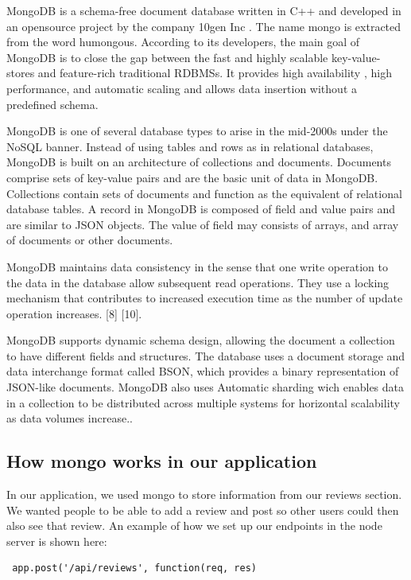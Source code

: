 MongoDB is a schema-free document database written in C++ and developed in an opensource project by the company 10gen Inc \cite{mongoname}. The name mongo is extracted from the word humongous. According to its developers, the main
goal of MongoDB is to close the gap between the fast and highly scalable key-value-stores and feature-rich traditional RDBMSs.
It provides high availability , high performance, and automatic scaling
and allows data insertion without a predefined schema. 

MongoDB is one of several database types to arise in the mid-2000s under the NoSQL banner. Instead of using tables and rows as in relational databases, MongoDB is built on an architecture of collections and documents. Documents comprise sets of key-value pairs and are the basic unit of data in MongoDB. Collections contain sets of documents and function as the equivalent of relational database tables. 
A record in MongoDB is composed of field and value pairs and are similar to
JSON objects. The value of field may consists of arrays, and array of documents
or other documents.

MongoDB maintains data consistency in the
sense that one write operation to the data in the database allow subsequent
read operations. They use a locking mechanism that contributes to increased
execution time as the number of update operation increases. [8] [10].

MongoDB supports dynamic schema design, allowing the document a collection to have different fields and structures. The database uses a document storage and data interchange format called BSON, which provides a binary representation of JSON-like documents. MongoDB also uses Automatic sharding wich enables data in a collection to be distributed across multiple systems for horizontal scalability as data volumes increase.\cite{MongoDB}.

\subsection{How mongo works in our application}
In our application, we used mongo to store information from our reviews section. We wanted people to be able to add a review and post so other users could then also see that review. An example of how we set up our endpoints in the node server is shown here:

\begin{verbatim}
 app.post('/api/reviews', function(req, res)
\end{verbatim}

